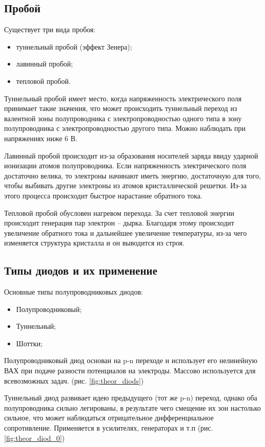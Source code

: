 \documentclass[a4paper, 12pt]{article}
\begin{document}
\subsection*{Пробой}

Существует три вида пробоя:
\begin{itemize}
    \item туннельный пробой (эффект Зенера);
    \item лавинный пробой;
    \item тепловой пробой.
\end{itemize}

Туннельный пробой имеет место, когда напряженность электрического поля принимает такие значения, что может происходить туннельный переход из валентной зоны полупроводника с электропроводностью одного типа в зону полупроводника с электропроводностью другого типа. Можно наблюдать при напряжениях ниже 6 В. 

Лавинный пробой происходит из-за образования носителей заряда ввиду ударной ионизации атомов полупроводника. Если напряженность электрического поля достаточно велика, то электроны начинают иметь энергию, достаточную для того, чтобы выбивать другие электроны из атомов кристаллической решетки. Из-за этого процесса происходит быстрое нарастание обратного тока.

Тепловой пробой обусловен нагревом перехода. За счет тепловой энергии происходит генерация пар электрон – дырка. Благодаря этому происходит увеличение обратного тока и дальнейшее увеличение температуры, из-за чего изменяется структура кристалла и он выводится из строя.

\subsection*{Типы диодов и их применение}

Основные типы полупроводниковых диодов:

\begin{itemize}
    \item Полупроводниковый;
    \item Туннельный;
    \item Шоттки;
\end{itemize}

Полупроводниковый диод основан на p-n переходе и использует его нелинейную ВАХ при подаче разности потенциалов на электроды. Массово используется для всевозможных задач. (рис. \ref{fig:theor_diods})

Туннельный диод развивает идею предыдущего (тот же p-n) переход, однако оба полупроводника сильно легированы, в результате чего смещение их зон настолько сильное, что может наблюдаться отрицательное дифференциальное сопротивление. Применяется в усилителях, генераторах и т.п (рис. \ref{fig:theor_diod_0}) 
\end{document}
